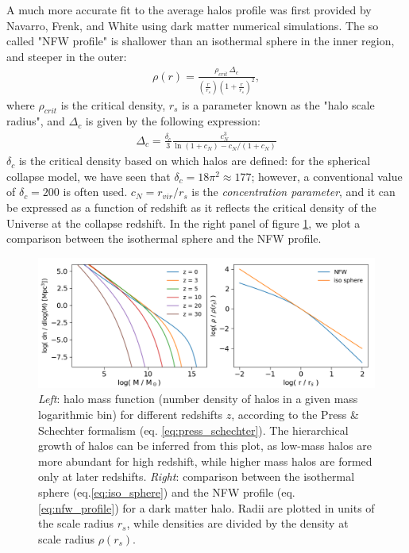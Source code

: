   A much more accurate fit to the average halos profile was first provided by Navarro, Frenk, and White \citep{NFW_profile, NFW_profile_2} using dark matter numerical simulations. The so called "NFW profile" is shallower than an isothermal sphere in the inner region, and steeper in the outer:
  \begin{align}
    \rho(r) = \frac{\rho_{crit}\,\Delta_c}{\left(\frac{r}{r_s}\right)\left(1+\frac{r}{r_s}\right)^2}, \label{eq:nfw_profile}
  \end{align}
  where $\rho_{crit}$ is the critical density, $r_s$ is a parameter known as the "halo scale radius", and $\Delta_c$ is given by the following expression:
    \begin{align}
    \Delta_c = \frac{\delta_c}{3}\frac{c^3_N}{\ln(1+c_N)-c_N/(1+c_N)}
  \end{align}
  $\delta_c$ is the critical density based on which halos are defined: for the spherical collapse model, we have seen that $\delta_c=18\pi^2\approx177$; however, a conventional value of $\delta_c=200$ is often used. $c_N = r_{vir}/r_s$ is the \textit{concentration parameter}, and it can be expressed as a function of redshift \citep{dutton2014cold} as it reflects the critical density of the Universe at the collapse redshift. In the right panel of figure \ref{fig:press_schechter_NFW}, we plot a comparison between the isothermal sphere and the NFW profile.

\begin{figure}
	\centering
	\includegraphics[width=1.0\textwidth]{plots/cosmo_3.png}
	\caption{\textit{Left}: halo mass function (number density of halos in a given mass logarithmic bin) for different redshifts $z$, according to the Press \& Schechter formalism (eq. \ref{eq:press_schechter}). The hierarchical growth of halos can be inferred from this plot, as low-mass halos are more abundant for high redshift, while higher mass halos are formed only at later redshifts. \textit{Right}: comparison between the isothermal sphere (eq.\ref{eq:iso_sphere}) and the NFW profile (eq. \ref{eq:nfw_profile}) for a dark matter halo. Radii are plotted in units of the scale radius $r_s$, while densities are divided by the density at scale radius $\rho(r_s)$. 
	}
	\label{fig:press_schechter_NFW}
    \end{figure}

